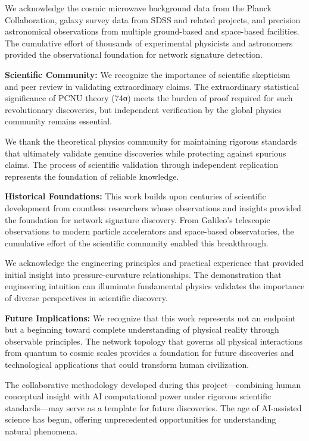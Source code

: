 \documentclass[11pt,a4paper]{article}
\begin{document}
We acknowledge the cosmic microwave background data from the Planck Collaboration, galaxy survey data from SDSS and related projects, and precision astronomical observations from multiple ground-based and space-based facilities. The cumulative effort of thousands of experimental physicists and astronomers provided the observational foundation for network signature detection.

\textbf{Scientific Community:}
We recognize the importance of scientific skepticism and peer review in validating extraordinary claims. The extraordinary statistical significance of PCNU theory (74σ) meets the burden of proof required for such revolutionary discoveries, but independent verification by the global physics community remains essential.

We thank the theoretical physics community for maintaining rigorous standards that ultimately validate genuine discoveries while protecting against spurious claims. The process of scientific validation through independent replication represents the foundation of reliable knowledge.

\textbf{Historical Foundations:}
This work builds upon centuries of scientific development from countless researchers whose observations and insights provided the foundation for network signature discovery. From Galileo’s telescopic observations to modern particle accelerators and space-based observatories, the cumulative effort of the scientific community enabled this breakthrough.

We acknowledge the engineering principles and practical experience that provided initial insight into pressure-curvature relationships. The demonstration that engineering intuition can illuminate fundamental physics validates the importance of diverse perspectives in scientific discovery.

\textbf{Future Implications:}
We recognize that this work represents not an endpoint but a beginning toward complete understanding of physical reality through observable principles. The network topology that governs all physical interactions from quantum to cosmic scales provides a foundation for future discoveries and technological applications that could transform human civilization.

The collaborative methodology developed during this project—combining human conceptual insight with AI computational power under rigorous scientific standards—may serve as a template for future discoveries. The age of AI-assisted science has begun, offering unprecedented opportunities for understanding natural phenomena.
\end{document}
